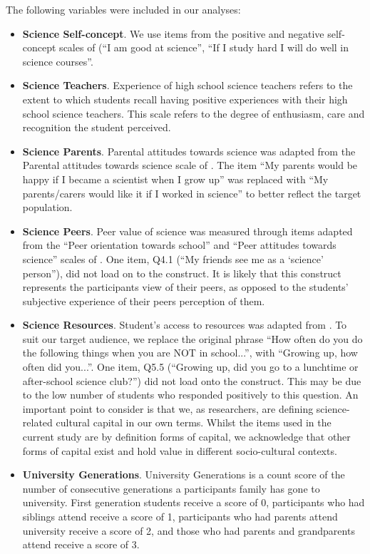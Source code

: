 The following variables were included in our analyses:
\begin{itemize}
    \item \textbf{Science Self-concept}. We use items from the positive and negative self-concept scales of \cite{dewitt2011high} (``I am good at science'', ``If I study hard I will do well in science courses''.   
    \item \textbf{Science Teachers}. Experience of high school science teachers refers to the extent to which students recall having positive experiences with their high school science teachers. This scale refers to the degree of enthusiasm, care and recognition the student perceived. 
    \item \textbf{Science Parents}. Parental attitudes towards science was adapted from the Parental attitudes towards science scale of \cite{dewitt2011high}. The item ``My parents would be happy if I became a scientist when I grow up'' was replaced with ``My parents/carers would like it if I worked in science'' to better reflect the target population.
    \item \textbf{Science Peers}. Peer value of science was measured through items adapted from the ``Peer orientation towards school'' and ``Peer attitudes towards science'' scales of \cite{dewitt2011high}. One item, Q4.1 (``My friends see me as a `science' person''), did not load on to the construct. It is likely that this construct represents the participants view of their peers, as opposed to the students' subjective experience of their peers perception of them.
    \item \textbf{Science Resources}. Student's access to resources was adapted from \cite{dewitt2011high}. To suit our target audience, we replace the original phrase ``How often do you do the following things when you are NOT in school...'', with ``Growing up, how often did you...''. One item, Q5.5 (``Growing up, did you go to a lunchtime or after-school science club?'') did not load onto the construct. This may be due to the low number of students who responded positively to this question. An important point to consider is that we, as researchers, are defining science-related cultural capital in our own terms. Whilst the items used in the current study are by definition forms of capital, we acknowledge that other forms of capital exist and hold value in different socio-cultural contexts.
    \item \textbf{University Generations}. University Generations is a count score of the number of consecutive generations a participants family has gone to university. First generation students receive a score of 0,  participants who had siblings attend receive a score of 1, participants who had parents attend university receive a score of 2, and those who had parents and grandparents attend receive a score of 3.

\end{itemize}
